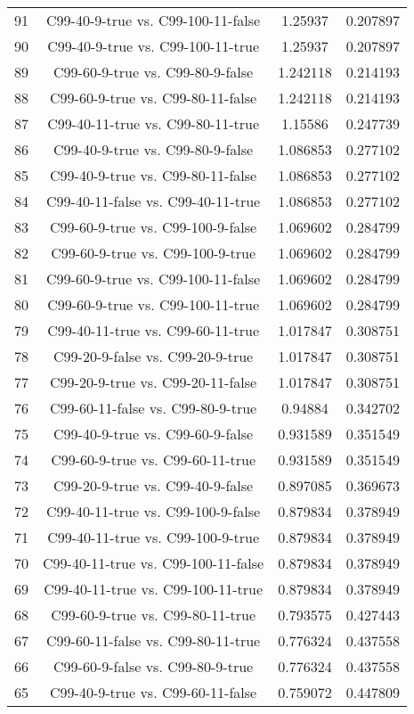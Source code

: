 \documentclass[a4paper,10pt]{article}
\begin{document}
\begin{landscape}
\begin{table}[!htp]
\begin{tabular}{cccc}
91&C99-40-9-true vs. C99-100-11-false&1.25937&0.207897\\
90&C99-40-9-true vs. C99-100-11-true&1.25937&0.207897\\
89&C99-60-9-true vs. C99-80-9-false&1.242118&0.214193\\
88&C99-60-9-true vs. C99-80-11-false&1.242118&0.214193\\
87&C99-40-11-true vs. C99-80-11-true&1.15586&0.247739\\
86&C99-40-9-true vs. C99-80-9-false&1.086853&0.277102\\
85&C99-40-9-true vs. C99-80-11-false&1.086853&0.277102\\
84&C99-40-11-false vs. C99-40-11-true&1.086853&0.277102\\
83&C99-60-9-true vs. C99-100-9-false&1.069602&0.284799\\
82&C99-60-9-true vs. C99-100-9-true&1.069602&0.284799\\
81&C99-60-9-true vs. C99-100-11-false&1.069602&0.284799\\
80&C99-60-9-true vs. C99-100-11-true&1.069602&0.284799\\
79&C99-40-11-true vs. C99-60-11-true&1.017847&0.308751\\
78&C99-20-9-false vs. C99-20-9-true&1.017847&0.308751\\
77&C99-20-9-true vs. C99-20-11-false&1.017847&0.308751\\
76&C99-60-11-false vs. C99-80-9-true&0.94884&0.342702\\
75&C99-40-9-true vs. C99-60-9-false&0.931589&0.351549\\
74&C99-60-9-true vs. C99-60-11-true&0.931589&0.351549\\
73&C99-20-9-true vs. C99-40-9-false&0.897085&0.369673\\
72&C99-40-11-true vs. C99-100-9-false&0.879834&0.378949\\
71&C99-40-11-true vs. C99-100-9-true&0.879834&0.378949\\
70&C99-40-11-true vs. C99-100-11-false&0.879834&0.378949\\
69&C99-40-11-true vs. C99-100-11-true&0.879834&0.378949\\
68&C99-60-9-true vs. C99-80-11-true&0.793575&0.427443\\
67&C99-60-11-false vs. C99-80-11-true&0.776324&0.437558\\
66&C99-60-9-false vs. C99-80-9-true&0.776324&0.437558\\
65&C99-40-9-true vs. C99-60-11-false&0.759072&0.447809\\

\end{tabular}
\end{table}
\end{landscape}
\end{document}
